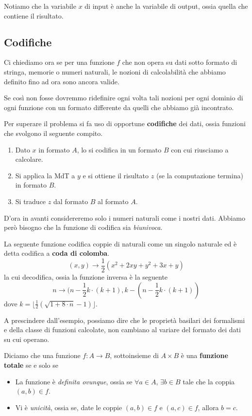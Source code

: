 Notiamo che la variabile $x$ di input è anche la variabile
di output, ossia quella che contiene il risultato.

\subsection{Codifiche}
Ci chiediamo ora se per una funzione $f$ che non opera su
dati sotto formato di stringa, memorie o numeri naturali,
le nozioni di calcolabilità che abbiamo definito fino ad ora
sono ancora valide.

Se così non fosse dovremmo ridefinire ogni volta tali nozioni
per ogni dominio di ogni funzione con un formato differente da
quelli che abbiamo già incontrato.

Per superare il problema si fa uso di opportune
\textbf{codifiche} dei dati, ossia funzioni che svolgono
il seguente compito.
\begin{enumerate}
	\item Dato $x$ in formato $A$, lo si codifica in un formato
	      $B$ con cui riusciamo a calcolare.
	\item Si applica la MdT a $y$ e si ottiene il risultato $z$
	      (se la computazione termina) in formato $B$.
	\item Si traduce $z$ dal formato $B$ al formato $A$.
\end{enumerate}
D'ora in avanti considereremo solo i numeri naturali come i
nostri dati. Abbiamo però bisogno che la funzione di codifica
sia \emph{biunivoca}.

\begin{example}
	La seguente funzione codifica coppie di naturali come un
	singolo naturale ed è detta codifica a
	\textbf{coda di colomba}.
	\[ (x, y) \to \frac{1}{2} (x^2 + 2 x y + y^2 + 3 x + y) \]
	la cui decodifica, ossia la funzione inversa è la seguente
	\[
		n \to (n - \frac{1}{2} k \cdot (k + 1),
		k - (n - \frac{1}{2} k \cdot (k + 1))
	\]
	dove $k=\lfloor \frac{1}{2}(\sqrt{1+8\cdot n}-1)\rfloor$.
\end{example}

A prescindere dall'esempio, possiamo dire che le proprietà
basilari dei formalismi e della classe di funzioni calcolate,
non cambiano al variare del formato dei dati su cui operano.

\begin{definition} \label{def: funzione totale}
	Diciamo che una funzione $f : A \to B$, sottoinsieme di
	$A \times B$ è una \textbf{funzione totale} se e solo se
	\begin{itemize}
		\item La funzione è \emph{definita ovunque}, ossia se
		      $\forall a \in A$, $\exists b \in B$ tale che la
		      coppia $(a, b) \in f$.
		\item Vi è \emph{unicità}, ossia se, date le coppie
		      $(a, b) \in f$ e $(a, c) \in f$, allora $b=c$.
	\end{itemize}
\end{definition}

